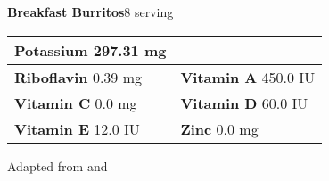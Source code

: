\documentclass[../recipe-collections/cooking.tex]{subfiles}
\begin{document}
\begin{recipe}{\textbf{Breakfast Burritos}}{8 serving}{}
\begin{tabular}{|lr|}
      \multicolumn{1}{|l|}{\textbf{Potassium} \textrm{ 297.31  mg}}     \\ \hline
      \textbf{Riboflavin} \textrm{ 0.39  mg}  &
      \multicolumn{1}{|l|}{\textbf{Vitamin A} \textrm{ 450.0 IU }}        \\ \hline
      \textbf{Vitamin C} \textrm{ 0.0  mg}      &
      \multicolumn{1}{|l|}{\textbf{Vitamin D} \textrm{ 60.0  IU}}         \\ \hline
      \textbf{Vitamin E} \textrm{ 12.0  IU}     &
      \multicolumn{1}{|l|}{\textbf{Zinc} \textrm{ 0.0  mg}}               \\ \hline
  \end{tabular}

  \freeform{}\hrulefill{}

\end{recipe}

Adapted from  
\autocite{Pillsbury_BreakfastBurritos_2021} and
\autocite{MirlandrasKitchen_HashBrowns_2017}
\end{document}
